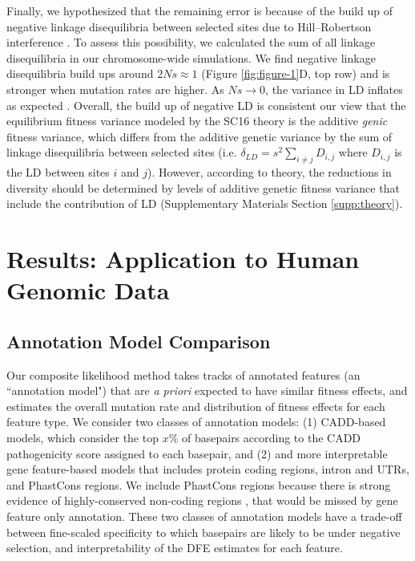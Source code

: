 \documentclass[11pt]{article}
\begin{document}
Finally, we hypothesized that the remaining error is because of the build up of
negative linkage disequilibria between selected sites due to Hill--Robertson
interference \parencite{Hill1966-kd,McVean2000-bt,Comeron2007-wq}. To assess
this possibility, we calculated the sum of all linkage disequilibria in our
chromosome-wide simulations. We find negative linkage disequilibria build ups
around $2Ns \approx 1$ (Figure \ref{fig:figure-1}D, top row) and is stronger
when mutation rates are higher. As $Ns \to 0$, the variance in LD inflates as
expected \parencite{Ohta1969-ae,Hill1968-ue}. Overall, the build up of negative
LD is consistent our view that the equilibrium fitness variance modeled by the
SC16 theory is the additive \emph{genic} fitness variance, which differs from
the additive genetic variance by the sum of linkage disequilibria between
selected sites (i.e. $\delta_{LD} = s^2 \sum_{i\ne j} D_{i,j}$ where $D_{i,j}$
is the LD between sites $i$ and $j$). However, according to theory, the
reductions in diversity should be determined by levels of additive genetic
fitness variance that include the contribution of LD (Supplementary Materials
Section \ref{supp:theory}).

\section*{Results: Application to Human Genomic Data}

\subsection*{Annotation Model Comparison}

Our composite likelihood method takes tracks of annotated features (an
``annotation model") that are \emph{a priori} expected to have similar fitness
effects, and estimates the overall mutation rate and distribution of fitness
effects for each feature type. We consider two classes of annotation models:
(1) CADD-based models, which consider the top $x\%$ of basepairs according to
the CADD pathogenicity score assigned to each basepair, and (2) and more
interpretable gene feature-based models that includes protein coding regions,
intron and UTRs, and PhastCons regions. We include PhastCons regions because
there is strong evidence of highly-conserved non-coding regions
\parencite{Meader2010-hm,Harmston2013-tt,Katzman2007-gq,Siepel2005-wh}, that
would be missed by gene feature only annotation. These two classes of
annotation models have a trade-off between fine-scaled specificity to which
basepairs are likely to be under negative selection, and interpretability of
the DFE estimates for each feature.
\end{document}
